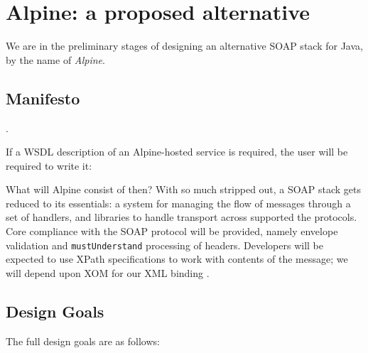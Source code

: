 \section{Alpine: a proposed alternative}
\label{alpine}

We are in the preliminary stages of designing an alternative SOAP
stack for Java, by the name of \emph{Alpine}.

\subsection{Manifesto}
\label{alpine:manifesto}

.

If a WSDL description of an Alpine-hosted service is required, the
user will be required to write it: 

What will Alpine consist of then? With so much stripped out, a SOAP
stack gets reduced to its essentials: a system for managing the flow
of messages through a set of handlers, and libraries to handle
transport across supported the protocols. Core compliance with the
SOAP protocol will be provided, namely envelope validation and
\verb|mustUnderstand| processing of headers. Developers will be
expected to use XPath specifications to work with contents of the
message; we will depend upon XOM for our XML binding
\cite{harold:xom}.

\subsection{Design Goals}
\label{alpine:design}

The full design goals are as follows:

